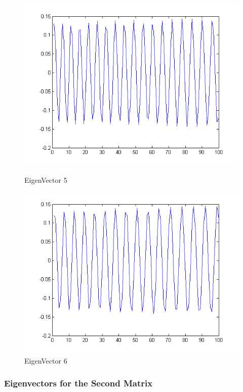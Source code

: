 \documentclass[12pt]{article}
\begin{document}
\begin{figure}[H]
\begin{minipage}[b]{0.5\linewidth}
\includegraphics[scale=.5]{v1p5.png}
\caption{EigenVector 5}
\end{minipage}
\begin{minipage}[b]{0.5\linewidth}
\includegraphics[scale=.5]{v1p6.png}
\caption{EigenVector 6}
\end{minipage}
\end{figure}


\subsubsection*{Eigenvectors for the Second Matrix}
\end{document}
